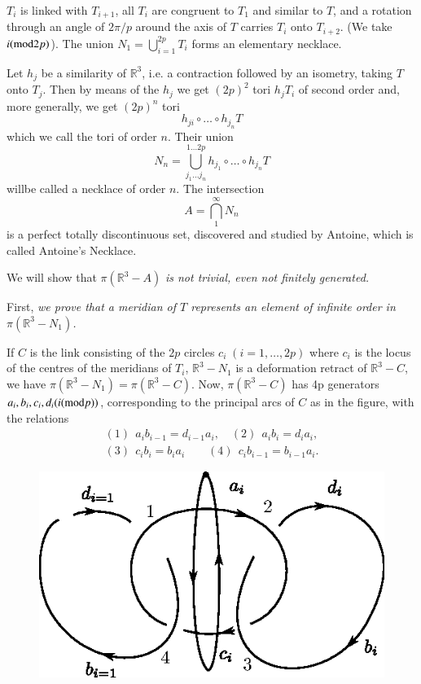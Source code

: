 $T_i$ is linked with $T_{i +1}$, all $T_i$ are congruent to $T_1$ and
similar to $T$, and a rotation through an angle of $2 \pi /p$ around
the axis of $T$ carries $T_i$ onto $T_{i + 2}$. (We take $i({\rm mod}
2p)$). The union $N_1 = \bigcup\limits^{2p}_{i = 1} T_i$ forms an
elementary necklace. 

Let $h_j$ be a similarity of $\mathbb{R}^3$, i.e. a contraction
followed by an isometry, taking $T$ onto $T_j$. Then by means of the
$h_j$ we get $(2p)^2$ tori $h_j T_i$ of second order and, more
generally, we get $(2p)^n$ tori 
$$
h_{ji} \circ  \ldots \circ  h_{j_{n}} T
$$
which we call the tori of order $n$. Their union  
$$
N_n = \bigcup\limits^{1 \ldots 2p}_{j_1 \ldots j_n} h_{j_{1}} \circ 
\ldots \circ  h_{j_{n}} T 
$$
will\pageoriginale be called a necklace of order $n$. The intersection
$$
A = \bigcap^{\infty}_1 N_n
$$
is a perfect totally discontinuous set, discovered and studied by
Antoine, which is called Antoine's Necklace. 

We will show that $\pi (\mathbb{R}^3 -A)$ \textit{is not trivial, even
  not finitely generated.} 

First, \textit{we prove that a meridian of $T$ represents an element
  of infinite order in $\pi(\mathbb{R}^3 - N_1)$.} 
 
If $C$ is the link consisting of the $2p$ circles $c_i\;(i = 1, \ldots,
2p)$ where $c_i$ is the locus of the centres of the meridians of
$T_i$, $\mathbb{R}^3 -N_1$ is a deformation retract of
$\mathbb{R}^3-C$, we have $\pi(\mathbb{R}^3 -N_1) =
\pi(\mathbb{R}^3-C)$. Now, $\pi(\mathbb{R}^3 -C)$ has 4p generators
$a_i, b_i, c_i, d_i(i ({\rm mod} p))$, corresponding to the principal
arcs of $C$ as in the figure, with the relations  
\begin{gather*}
(1) ~~ a_i b_{i -1} = d_{i- 1} a_i, \quad (2) ~~ a_i b_i = d_i a_i,\\
(3) ~~ c_i b_i = b_i a_i \qquad (4) ~~ c_i b_{i-1} = b_{i-1} a_i.
\end{gather*}
\begin{figure}[H]
\centering
\includegraphics{vol44-fig/fig44-9.eps}
\end{figure}


